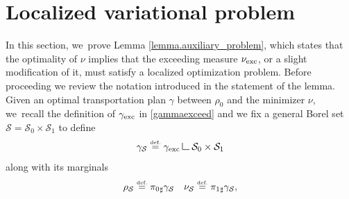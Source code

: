 \documentclass[10pt]{amsart}
\theoremstyle{definition}
\newcommand{\eqdef}{\ensuremath{\stackrel{\mbox{\upshape\tiny def.}}{=}}}
\newcommand\LM[1]{\hbox{\vrule width.5pt \vbox to#1pt{\vfill \hrule width#1pt height.5pt}}}
\newcommand\LL{{\mathchoice {\>\LM7\>}{\>\LM7\>}{\,\LM5\,}{\,\LM{3.35}\,}}}
\newcommand{\mres}{\LL}
\newcommand{\nuexc}{\nu_{\textup{exc}}}
\newcommand{\gammaexc}{\gamma_{\textup{exc}}}
\begin{document}
\appendix

\section{Localized variational problem}\label{appendix.localized_variational_problem}
In this section, we~prove Lemma \ref{lemma.auxiliary_problem}, which states that the optimality of $\nu$ implies that the exceeding measure $\nuexc$, or a slight modification of it, must satisfy a localized optimization problem. Before proceeding we review the notation introduced in the statement of the lemma. Given an optimal transportation plan $\gamma$ between $\rho_0$ and the minimizer $\nu$, we~recall the definition of $\gammaexc$ in \eqref{gammaexceed} and we fix a general Borel set $\mathcal{S} = \mathcal{S}_0 \times \mathcal{S}_1$ to define
\[
\gamma_{\mathcal{S}} \eqdef \gammaexc \mres \mathcal{S}_0\times\mathcal{S}_1
\]
along with its marginals
\[
\rho_{\mathcal{S}} \eqdef {\pi_{0}}_\sharp\gamma_\mathcal{S}
\quad \nu_{\mathcal{S}} \eqdef {\pi_{1}}_\sharp\gamma_{\mathcal{S}},
\]
\end{document}
